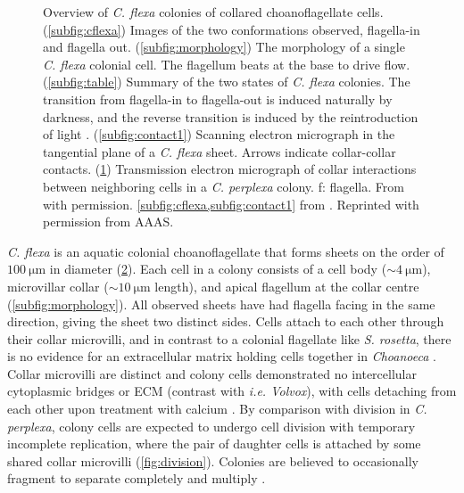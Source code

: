 \begin{figure}[htbp]
\begin{subfigure}[b]{0.43\textwidth}
		\caption{}
		\label{subfig:contact2}
	\end{subfigure}
	\caption[Overview of \textit{C. flexa} colonies of collared choanoflagellate cells]{Overview of \textit{C. flexa} colonies of collared choanoflagellate cells. (\ref{subfig:cflexa}) Images of the two conformations observed, flagella-in and flagella out. (\ref{subfig:morphology}) The morphology of a single \textit{C. flexa} colonial cell. The flagellum beats at the base to drive flow. (\ref{subfig:table}) Summary of the two states of \textit{C. flexa} colonies. The transition from flagella-in to flagella-out is induced naturally by darkness, and the reverse transition is induced by the reintroduction of light \citep{brunet2019}. (\ref{subfig:contact1}) Scanning electron micrograph in the tangential plane of a \textit{C. flexa} sheet. Arrows indicate collar-collar contacts. (\ref{subfig:contact2}) Transmission electron micrograph of collar interactions between neighboring cells in a \textit{C. perplexa} colony. f: flagella. From \citet{leadbeater1983} with permission. \cref{subfig:cflexa,subfig:contact1} from \citet{brunet2019}. Reprinted with permission from AAAS.}
	\label{fig:cflexa}
\end{figure} 

\textit{C. flexa} is an aquatic colonial choanoflagellate that forms sheets on the order of $\SI{100}{\micro\meter}$ in diameter (\cref{fig:cflexa}).
Each cell in a colony consists of a cell body ($\sim \SI{4}{\micro\meter}$), microvillar collar ($\sim\SI{10}{\micro\meter}$ length), and apical flagellum at the collar centre (\cref{subfig:morphology}).
All observed sheets have had flagella facing in the same direction, giving the sheet two distinct sides.
Cells attach to each other through their collar microvilli, and in contrast to a colonial flagellate like \textit{S. rosetta}, there is no evidence for an extracellular matrix holding cells together in \textit{Choanoeca} \citep{leadbeater1983,brunet2019}.
Collar microvilli are distinct and colony cells demonstrated no intercellular cytoplasmic bridges or ECM (contrast with \textit{i.e. Volvox}), with cells detaching from each other upon treatment with calcium \citep{thibaut}.
By comparison with division in \textit{C. perplexa}, colony cells are expected to undergo cell division with temporary incomplete replication, where the pair of daughter cells is attached by some shared collar microvilli (\cref{fig:division}).
Colonies are believed to occasionally fragment to separate completely and multiply \citep{leadbeater1983}.

